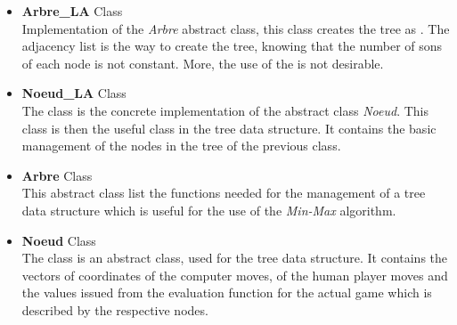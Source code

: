 \documentclass[a4paper,10pt]{report}
\newcommand{\empha}[1]{\textbf{\color{blue}{#1}}}
\begin{document}
\begin{itemize}
				\item \textbf{Arbre\_LA} Class \\
Implementation of the \emph{Arbre} abstract class, this class creates the tree as \empha{Adjacency list}. The adjacency list is the way to create the \empha{Min-Max} tree, knowing that the number of sons of each node is not constant. More, the use of the \empha{Modular Array} is not desirable.

				\item \textbf{Noeud\_LA} Class\\
The class \empha{Noeud\_LA} is the concrete implementation of the abstract class \emph{Noeud}. This class is then the useful class in the tree data structure. It contains the basic management of the nodes in the tree  of the previous \empha{Arbre\_LA} class.

				\item \textbf{Arbre} Class\\
					This abstract class list the functions needed for the management of a tree data structure which is useful for the use of the \emph{Min-Max} algorithm.

				\item \textbf{Noeud} Class\\
					The class \empha{Noeud} is an abstract class, used for the tree data structure. It contains the vectors of coordinates of the computer moves, of the human player moves and the values issued from the evaluation function for the actual game which is described by the respective nodes.

			\end{itemize}
\end{document}

